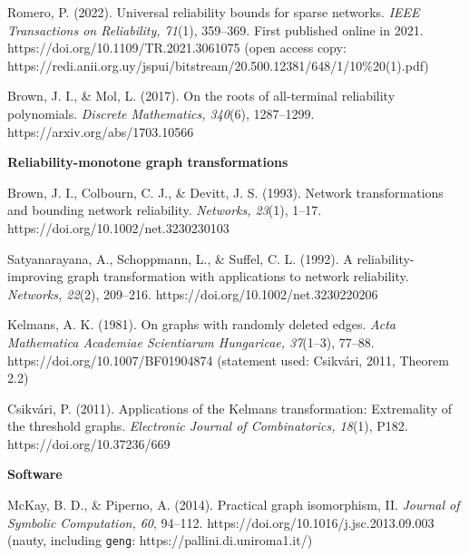 \documentclass[
  11pt,
]{article}
\theoremstyle{definition}
\theoremstyle{remark}
\begin{document}
Romero, P. (2022). Universal reliability bounds for sparse networks.
\emph{IEEE Transactions on Reliability, 71}(1), 359--369. First
published online in 2021. https://doi.org/10.1109/TR.2021.3061075 (open
access copy:
https://redi.anii.org.uy/jspui/bitstream/20.500.12381/648/1/10\%20(1).pdf)

Brown, J. I., \& Mol, L. (2017). On the roots of all-terminal
reliability polynomials. \emph{Discrete Mathematics, 340}(6),
1287--1299. https://arxiv.org/abs/1703.10566

\textbf{Reliability-monotone graph transformations}

Brown, J. I., Colbourn, C. J., \& Devitt, J. S. (1993). Network
transformations and bounding network reliability. \emph{Networks,
23}(1), 1--17. https://doi.org/10.1002/net.3230230103

Satyanarayana, A., Schoppmann, L., \& Suffel, C. L. (1992). A
reliability-improving graph transformation with applications to network
reliability. \emph{Networks, 22}(2), 209--216.
https://doi.org/10.1002/net.3230220206

Kelmans, A. K. (1981). On graphs with randomly deleted edges. \emph{Acta
Mathematica Academiae Scientiarum Hungaricae, 37}(1--3), 77--88.
https://doi.org/10.1007/BF01904874 (statement used: Csikvári, 2011,
Theorem 2.2)

Csikvári, P. (2011). Applications of the Kelmans transformation:
Extremality of the threshold graphs. \emph{Electronic Journal of
Combinatorics, 18}(1), P182. https://doi.org/10.37236/669

\textbf{Software}

McKay, B. D., \& Piperno, A. (2014). Practical graph isomorphism, II.
\emph{Journal of Symbolic Computation, 60}, 94--112.
https://doi.org/10.1016/j.jsc.2013.09.003 (nauty, including
\texttt{geng}: https://pallini.di.uniroma1.it/)
\end{document}
